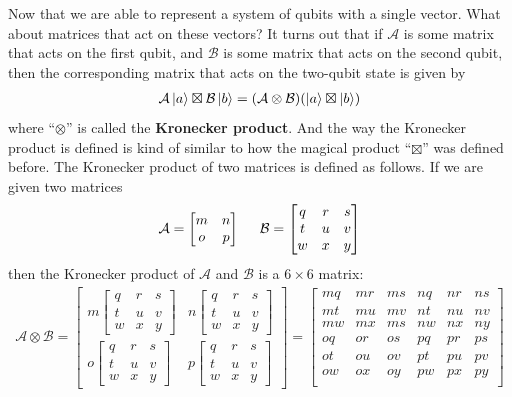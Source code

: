 \documentclass[a4paper,11pt]{article}
\numberwithin{equation}{section}
\theoremstyle{definition}
\newcommand{\A}{\mathcal{A}}
\begin{document}
Now that we are able to represent a system of qubits with a single vector. What about matrices that act on these vectors? It turns out that if $\mathcal{A}$ is some matrix that acts on the first qubit, and $\mathcal{B}$ is some matrix that acts on the second qubit, then the corresponding matrix that acts on the two-qubit state is given by
\begin{align*}
\A\ket{a} \boxtimes \mathcal{B}\ket{b} = (\A \otimes \mathcal{B})(\ket{a} \boxtimes \ket{b})
\end{align*}
where ``$\otimes$'' is called the \textbf{Kronecker product}. And the way the Kronecker product is defined is kind of similar to how the magical product ``$\boxtimes$'' was defined before. The Kronecker product of two matrices is defined as follows. If we are given two matrices
\begin{align*}
\A = \begin{bmatrix}
m & n \\ o & p
\end{bmatrix}
\hspace{0.5cm}
\mathcal{B} = \begin{bmatrix}
q & r & s \\ t & u & v \\ w&x&y
\end{bmatrix}
\end{align*} 
then the Kronecker product of $\mathcal{A}$ and $\mathcal{B}$ is a $6\times 6$ matrix:
\begin{align*}
\A \otimes \mathcal{B} = \begin{bmatrix}
m\begin{bmatrix}
q & r & s \\ t & u & v \\ w&x&y
\end{bmatrix} & n\begin{bmatrix}
q & r & s \\ t & u & v \\ w&x&y
\end{bmatrix}\\
o\begin{bmatrix}
q & r & s \\ t & u & v \\ w&x&y
\end{bmatrix} & p\begin{bmatrix}
q & r & s \\ t & u & v \\ w&x&y
\end{bmatrix}
\end{bmatrix}
=
\begin{bmatrix}
mq & mr & ms & nq & nr & ns\\
mt & mu & mv & nt & nu & nv\\
mw & mx & ms & nw & nx & ny\\
oq & or & os & pq & pr & ps\\
ot & ou & ov & pt & pu & pv\\
ow & ox & oy & pw & px & py\\
\end{bmatrix}
\end{align*}
\end{document}
